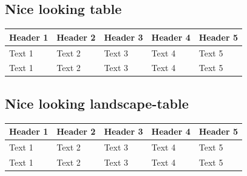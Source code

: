 \documentclass{article}
\begin{document}
\subsection{Nice looking table}
\begin{longtable}{@{}lllll@{}}
\toprule
\textbf{Header 1} & \textbf{Header 2} & \textbf{Header 3} & \textbf{Header 4} & \textbf{Header 5} \\* \midrule
\endfirsthead
%
\endhead
%
Text 1            & Text 2            & Text 3            & Text 4            & Text 5            \\
Text 1            & Text 2            & Text 3            & Text 4            & Text 5            \\* \bottomrule
\end{longtable}

\subsection{Nice looking landscape-table}
\begin{landscape}
\begin{longtable}{@{}lllll@{}}
\toprule
\textbf{Header 1} & \textbf{Header 2} & \textbf{Header 3} & \textbf{Header 4} & \textbf{Header 5} \\* \midrule
\endfirsthead
%
\endhead
%
Text 1            & Text 2            & Text 3            & Text 4            & Text 5            \\
Text 1            & Text 2            & Text 3            & Text 4            & Text 5            \\* \bottomrule
\end{longtable}
\end{landscape}

\newpage
\end{document}
